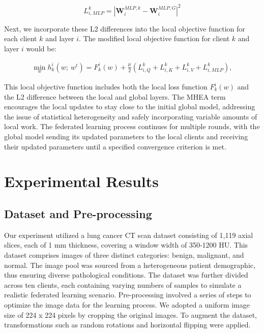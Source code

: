 \begin{equation}
L_{i,MLP}^k = |\mathbf{W}^{MLP,k}_i - \mathbf{W}^{MLP,G}_i|^2
\end{equation}

Next, we incorporate these L2 differences into the local objective function for each client $k$ and layer $i$. The modified local objective function for client $k$ and layer $i$ would be:

\begin{align}
\min_w
h_k^i(w; ~w^{t}) = F_k^i(w) + \frac{\mu}{2}\left(L_{i,Q}^k + L_{i,K}^k + L_{i,V}^k + L_{i,MLP}^k\right) ,
\end{align}

This local objective function includes both the local loss function $F_k^i(w)$ and the L2 difference between the local and global layers. The MHEA term encourages the local updates to stay close to the initial global model, addressing the issue of statistical heterogeneity and safely incorporating variable amounts of local work. The federated learning process continues for multiple rounds, with the global model sending its updated parameters to the local clients and receiving their updated parameters until a specified convergence criterion is met. 
 



 
\section{Experimental Results} 

\subsection{Dataset and Pre-processing} 

Our experiment utilized a lung cancer CT scan dataset consisting of 1,119 axial slices, each of 1 mm thickness, covering a window width of 350-1200 HU. This dataset comprises images of three distinct categories: benign, malignant, and normal. The image pool was sourced from a heterogeneous patient demographic, thus ensuring diverse pathological conditions. The dataset was further divided across ten clients, each containing varying numbers of samples to simulate a realistic federated learning scenario. Pre-processing involved a series of steps to optimize the image data for the learning process. We adopted a uniform image size of 224 x 224 pixels by cropping the original images. To augment the dataset, transformations such as random rotations and horizontal flipping were applied.

